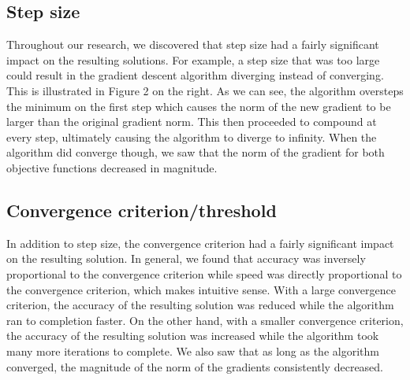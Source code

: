 \documentclass{article}
\begin{document}
\subsection{Step size}
Throughout our research, we discovered that step size had a fairly significant impact on the resulting solutions. For example, a step size that was too large could result in the gradient descent algorithm diverging instead of converging. This is illustrated in Figure 2 on the right. As we can see, the algorithm oversteps the minimum on the first step which causes the norm of the new gradient to be larger than the original gradient norm. This then proceeded to compound at every step, ultimately causing the algorithm to diverge to infinity. When the algorithm did converge though, we saw that the norm of the gradient for both objective functions decreased in magnitude. 
  
\subsection{Convergence criterion/threshold}
In addition to step size, the convergence criterion had a fairly significant impact on the resulting solution. In general, we found that accuracy was inversely proportional to the convergence criterion while speed was directly proportional to the convergence criterion, which makes intuitive sense. With a large convergence criterion, the accuracy of the resulting solution was reduced while the algorithm ran to completion faster. On the other hand, with a smaller convergence criterion, the accuracy of the resulting solution was increased while the algorithm took many more iterations to complete. We also saw that as long as the algorithm converged, the magnitude of the norm of the gradients consistently decreased. \\ \\
\end{document}
